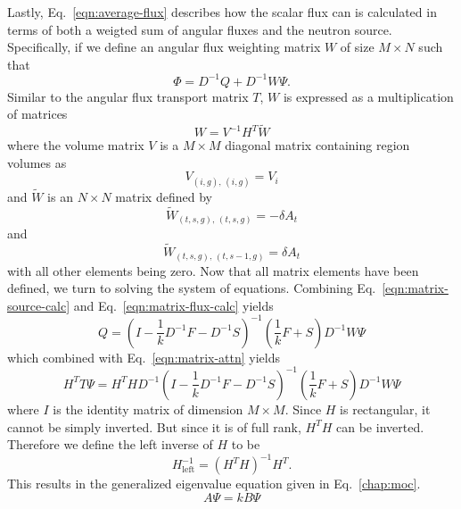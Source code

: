 Lastly, Eq.~\ref{eqn:average-flux} describes how the scalar flux can is calculated in terms of both a weigted sum of angular fluxes and the neutron source. Specifically, if we define an angular flux weighting matrix $W$ of size $M \times N$ such that
\begin{equation}
\Phi = D^{-1}Q + D^{-1} W \Psi.
\label{eqn:matrix-flux-calc}
\end{equation}
Similar to the angular flux transport matrix $T$, $W$ is expressed as a multiplication of matrices
\begin{equation}
W = V^{-1} H^T \tilde{W}
\end{equation}
where the volume matrix $V$ is a $M \times M$ diagonal matrix containing region volumes as
\begin{equation}
V_{\left(i, g\right), \, \left(i, g\right)} = V_i
\end{equation}
and $\tilde{W}$ is an $N \times N$ matrix defined by
\begin{equation}
\tilde{W}_{\left(t,s,g\right), \, \left(t, s, g\right)} = -\delta A_{t}
\end{equation}
and
\begin{equation}
\tilde{W}_{\left(t,s,g\right), \, \left(t, s-1, g\right)} = \delta A_{t}
\end{equation}
with all other elements being zero. Now that all matrix elements have been defined, we turn to solving the system of equations. Combining Eq.~\ref{eqn:matrix-source-calc} and Eq.~\ref{eqn:matrix-flux-calc} yields
\begin{equation}
Q = \left(I - \frac{1}{k} D^{-1} F - D^{-1} S \right)^{-1} \left(\frac{1}{k} F + S \right) D^{-1} W \Psi
\end{equation}
which combined with Eq.~\ref{eqn:matrix-attn} yields
\begin{equation}
H^T T \Psi = H^T H D^{-1} \left(I - \frac{1}{k} D^{-1} F - D^{-1} S \right)^{-1} \left(\frac{1}{k} F + S \right) D^{-1} W \Psi
\end{equation}
where $I$ is the identity matrix of dimension $M \times M$. Since $H$ is rectangular, it cannot be simply inverted. But since it is of full rank, $H^T H$ can be inverted. Therefore we define the left inverse of $H$ to be
\begin{equation}
H_{\text{left}}^{-1} = \left(H^T H\right)^{-1} H^T.
\end{equation}
This results in the generalized eigenvalue equation given in Eq.~\ref{chap:moc}.
\begin{equation}
A \Psi = k B \Psi
\label{eqn:gen-eig}
\end{equation}
